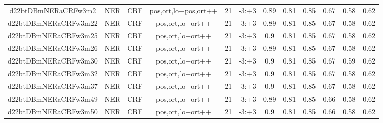 \documentclass[a4paper]{article}
\begin{document}
\begin{landscape}
\begin{center}
\begin{tabular}{ |c|c|c|c|c|c|c|c|c|c|c|c|}
 	

 
 	
 	\small{ d22btDBmNERaCRFw3m2 } & \small{ NER} & \small{  CRF }  & pos,ort,lo+pos,ort++  &  21 &  \small{  -3:+3 }  &  0.89 & 0.81 & 0.85  &  0.67 & 0.58 & 0.62 \\
 	

 
 	
 	\small{ d22btDBmNERaCRFw3m22 } & \small{ NER} & \small{  CRF }  & pos,ort,lo+ort++  &  21 &  \small{  -3:+3 }  &  0.89 & 0.81 & 0.85  &  0.67 & 0.58 & 0.62 \\
 	

 
 	
 	\small{ d22btDBmNERaCRFw3m25 } & \small{ NER} & \small{  CRF }  & pos,ort,lo+ort++  &  21 &  \small{  -3:+3 }  &  0.9 & 0.81 & 0.85  &  0.67 & 0.58 & 0.62 \\
 	

 
 	
 	\small{ d22btDBmNERaCRFw3m26 } & \small{ NER} & \small{  CRF }  & pos,ort,lo+ort++  &  21 &  \small{  -3:+3 }  &  0.89 & 0.81 & 0.85  &  0.67 & 0.58 & 0.62 \\
 	

 
 	
 	\small{ d22btDBmNERaCRFw3m30 } & \small{ NER} & \small{  CRF }  & pos,ort,lo+ort++  &  21 &  \small{  -3:+3 }  &  0.9 & 0.81 & 0.85  &  0.67 & 0.59 & 0.62 \\
 	

 
 	
 	\small{ d22btDBmNERaCRFw3m32 } & \small{ NER} & \small{  CRF }  & pos,ort,lo+ort++  &  21 &  \small{  -3:+3 }  &  0.9 & 0.81 & 0.85  &  0.67 & 0.58 & 0.62 \\
 	

 
 	
 	\small{ d22btDBmNERaCRFw3m37 } & \small{ NER} & \small{  CRF }  & pos,ort,lo+ort++  &  21 &  \small{  -3:+3 }  &  0.9 & 0.81 & 0.85  &  0.67 & 0.58 & 0.62 \\
 	

 
 	
 	\small{ d22btDBmNERaCRFw3m49 } & \small{ NER} & \small{  CRF }  & pos,ort,lo+ort++  &  21 &  \small{  -3:+3 }  &  0.89 & 0.81 & 0.85  &  0.66 & 0.58 & 0.62 \\
 	

 
 	
 	\small{ d22btDBmNERaCRFw3m50 } & \small{ NER} & \small{  CRF }  & pos,ort,lo+ort++  &  21 &  \small{  -3:+3 }  &  0.9 & 0.81 & 0.85  &  0.66 & 0.58 & 0.62 \\
 	


\end{tabular}
\end{center}
\end{landscape}
\end{document}
